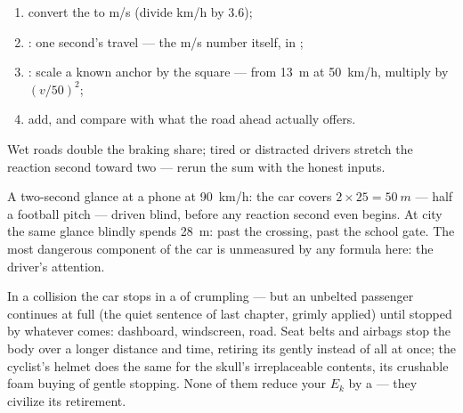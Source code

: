 \begin{method}\label{met:g9:kinetic-energy-safety:estimate}
\begin{enumerate}
  \item convert the  to \unit{m/s} (divide \unit{km/h}
        by $3.6$);
  \item {}: one second's travel --- the
        \unit{m/s} number itself, in ;
  \item {}: scale a known anchor by the square
        --- from \qty{13}{m} at \qty{50}{km/h}, multiply by
        $(v/50)^2$;
  \item add, and compare with what the road ahead actually
        offers.
\end{enumerate}
Wet roads double the braking share; tired or distracted
drivers stretch the reaction second toward two --- rerun the
sum with the honest inputs.
\end{method}

\begin{example}\label{ex:g9:kinetic-energy-safety:glance}
A two-second glance at a phone at \qty{90}{km/h}: the car
covers $2 \times 25 = \qty{50}{m}$ --- half a football pitch
--- driven blind, before any reaction second even begins. At
city  the same glance blindly spends \qty{28}{m}: past
the crossing, past the school gate. The most dangerous
component of the car is unmeasured by any formula here: the
driver's attention.
\end{example}

\begin{remark}\label{rem:g9:kinetic-energy-safety:belts}
In a collision the car stops in a  of crumpling --- but
an unbelted passenger continues at full  (the quiet
sentence of last chapter, grimly applied) until stopped by
whatever comes: dashboard, windscreen, road. Seat belts and
airbags stop the body over a longer distance and time,
retiring its  gently instead of all at once;
the cyclist's helmet does the same for the skull's
irreplaceable contents, its crushable foam buying
 of gentle stopping. None of them reduce your
$E_k$ by a  --- they civilize its retirement.
\end{remark}

